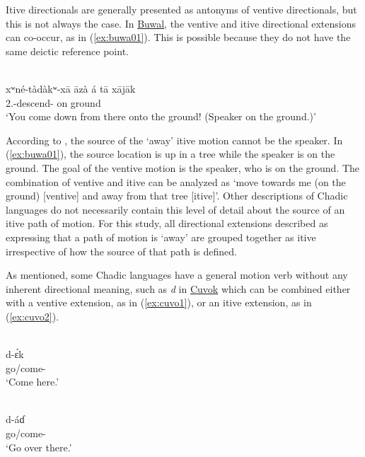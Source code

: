 Itive directionals are generally presented as antonyms of ventive directionals, but this is not always the case. In \hyperref[buwa]{Buwal}, the ventive and itive directional extensions can co-occur, as in (\ref{ex:buwa01}). This is possible because they do not have the same deictic reference point.

\ea\label{ex:buwa01}
 \\
\gll xʷné-tàdàkʷ-xā āzà á tā xājāk \\
2.-descend-   on ground\\ 
\glt `You come down from there onto the ground! (Speaker on the ground.)'
\z

According to \citet[378]{viljoenGrammaticalDescriptionBuwal2013}, the source of the `away' itive motion cannot be the speaker. In (\ref{ex:buwa01}), the source location is up in a tree while the speaker is on the ground. The goal of the ventive motion is the speaker, who is on the ground. The combination of ventive and itive can be analyzed as `move towards me (on the ground) [ventive] and away from that tree [itive]'. Other descriptions of Chadic languages do not necessarily contain this level of detail about the source of an itive path of motion. For this study, all directional extensions described as expressing that a path of motion is `away' are grouped together as itive irrespective of how the source of that path is defined.

As mentioned, some Chadic languages have a general motion verb without any inherent directional meaning, such as \textit{d} in \hyperref[cuvo]{Cuvok} which can be combined either with a ventive extension, as in (\ref{ex:cuvo1}), or an itive extension, as in (\ref{ex:cuvo2}).

\ea\label{ex:cuvo1}
 \\
\gll d-ɛ́k	\\
go/come- \\
\glt `Come here.'

\ex\label{ex:cuvo2}
 \\
\gll d-áɗ \\
go/come- \\
\glt `Go over there.'
\z 

